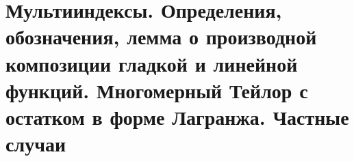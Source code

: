 \section{Мультииндексы. Определения, обозначения, лемма о производной композиции гладкой и линейной функций. Многомерный Тейлор с остатком в форме Лагранжа. Частные случаи}
